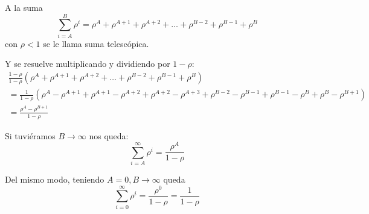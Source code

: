 \documentclass{upmassignment}
\date{\today}
\begin{document}
A la suma
\begin{equation}
    \sum_{i=A}^{B}\rho^i
    = \rho^A+\rho^{A+1}+\rho^{A+2}+
    \ldots + \rho^{B-2} + \rho^{B-1}
    + \rho^B
\end{equation}
con $\rho<1$
se le llama suma telescópica.

Y se resuelve multiplicando y
dividiendo por $1-\rho$:
\begin{multline*}
    \frac{1-\rho}{1-\rho}
    \left(
    \rho^A+\rho^{A+1}+\rho^{A+2}+
    \ldots + \rho^{B-2} + \rho^{B-1}
    + \rho^B
    \right)\\
    =\frac{1}{1-\rho}
    (\rho^A-\rho^{A+1}
    +\rho^{A+1}
    -\rho^{A+2}
    +\rho^{A+2}
    -\rho^{A+3}
    +\rho^{B-2}
    -\rho^{B-1}
    +\rho^{B-1}
    -\rho^{B}
    +\rho^B
    -\rho^{B+1}
    )\\
    = \frac{\rho^A-\rho^{B+1}}{1-\rho}
\end{multline*}

Si tuviéramos $B\to\infty$
nos queda:
\begin{equation}
    \sum_{i=A}^\infty
    \rho^i=\frac{\rho^A}{1-\rho}
\end{equation}

Del mismo modo, teniendo
$A=0,B\to\infty$ queda
\begin{equation}
    \sum_{i=0}^\infty
    \rho^i=\frac{\rho^0}{1-\rho}
    =\frac{1}{1-\rho}
\end{equation}
\end{document}
